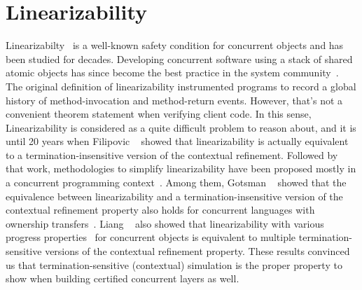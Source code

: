 \section{Linearizability}
\label{chatper:related:sec:linearizability}


Linearizabilty~\cite{herlihy90}  is a well-known safety condition for concurrent objects 
and has been studied for decades. 
Developing concurrent software using a stack of shared atomic objects has since
become the best practice in the system
community~\cite{Herlihy08book,ospp11}. 
The original definition of linearizability instrumented programs
to record a global history of method-invocation and method-return
events. However, that's not a convenient theorem statement when
verifying client code.
In this sense,
Linearizability is considered as a quite 
difficult problem to reason about, and it is until 20 years when 
Filipovic \etal~\cite{filipovic10} showed that linearizability is actually equivalent
to a termination-insensitive version of the contextual refinement.
Followed by that work, methodologies to simplify linearizability have been
proposed mostly in a concurrent programming context~\cite{Elmas10tacas,
Liang13pldi,Gotsman12concur,Viktor10CAV}.
Among them, Gotsman \etal~\cite{Gotsman12concur} showed that the equivalence between linearizability and a termination-insensitive version of the contextual refinement property also
holds for concurrent languages with ownership transfers~\cite{ohearn:concur04}.  
Liang \etal~\cite{liang13,lili16} also showed that linearizability with various
progress properties~\cite{Herlihy08book} for concurrent objects is
equivalent to multiple termination-sensitive versions of the contextual refinement property. 
These results convinced us that 
termination-sensitive (contextual) simulation is the proper property to show
when building certified
concurrent layers as well.

